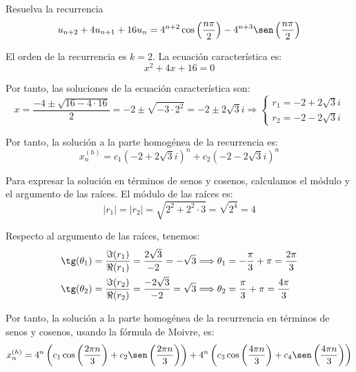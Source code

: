 \begin{ejercicio}
    Resuelva la recurrencia
    \begin{equation*}
        u_{n+2} + 4u_{n+1} + 16u_n = 4^{n+2} \cos \left(\dfrac{n\pi}{2} \right) -4^{n+3} \sen \left(\dfrac{n\pi}{2} \right) 
    \end{equation*}

    El orden de la recurrencia es $k=2$. La ecuación característica es:
    \begin{equation*}
        x^2 + 4x + 16 = 0
    \end{equation*}

    Por tanto, las soluciones de la ecuación característica son:
    \begin{equation*}
        x = \dfrac{-4\pm \sqrt{16 - 4\cdot 16}}{2}
        = -2\pm \sqrt{-3\cdot 2^2}
        = -2\pm 2\sqrt{3}i
        \Longrightarrow
        \left\{\begin{array}{l}
            r_1 = -2 + 2\sqrt{3}i \\
            r_2 = -2 - 2\sqrt{3}i
        \end{array}\right.
    \end{equation*}

    Por tanto, la solución a la parte homogénea de la recurrencia es:
    \begin{equation*}
        x_n^{(h)} = c_1(-2+2\sqrt{3}i)^n + c_2(-2-2\sqrt{3}i)^n
    \end{equation*}

    Para expresar la solución en términos de senos y cosenos, calculamos el módulo y el argumento de las raíces.
    El módulo de las raíces es:
    \begin{equation*}
        |r_1| = |r_2| = \sqrt{2^2 + 2^2\cdot 3} = \sqrt{2^4}=4
    \end{equation*}

    Respecto al argumento de las raíces, tenemos:
    \begin{align*}
        \tg(\theta_1) &= \frac{\Im(r_1)}{\Re(r_1)} = \frac{2\sqrt{3}}{-2} = -\sqrt{3} \Longrightarrow \theta_1 = -\frac{\pi}{3} + \pi = \frac{2\pi}{3}\\
        \tg(\theta_2) &= \frac{\Im(r_2)}{\Re(r_2)} = \frac{-2\sqrt{3}}{-2} = \sqrt{3} \Longrightarrow \theta_2 = \frac{\pi}{3} + \pi = \frac{4\pi}{3}        
    \end{align*}

    Por tanto, la solución a la parte homogénea de la recurrencia en términos de senos y cosenos, usando la fórmula de Moivre, es:
    \begin{equation*}
        x_n^{(h)} = 4^n\left(c_1\cos\left(\frac{2\pi n}{3}\right) + c_2\sen\left(\frac{2\pi n}{3}\right)\right)
        + 4^n\left(c_3\cos\left(\frac{4\pi n}{3}\right) + c_4\sen\left(\frac{4\pi n}{3}\right)\right)
    \end{equation*}


\end{ejercicio}
